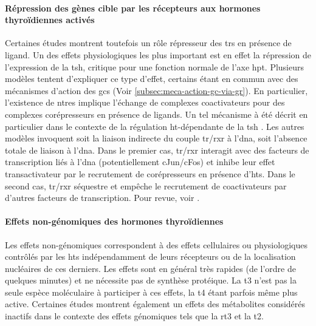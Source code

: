 

\paragraph{Répression des gènes cible par les récepteurs aux hormones thyroïdiennes activés}
Certaines études montrent toutefois un rôle répresseur des \glspl{tr} en présence de ligand.
Un des effets physiologiques les plus important est en effet la répression de l'expression de la \gls{tsh}, critique pour une fonction normale de l'axe \gls{hpt}.
Plusieurs modèles tentent d'expliquer ce type d'effet, certains étant en commun avec des mécanismes d'action des \glspl{gc} (Voir \autoref{subsec:meca-action-gc-via-gr}).
En particulier, l'existence de \glspl{ntre} implique l'échange de complexes coactivateurs pour des complexes corépresseurs en présence de ligands.
Un tel mécanisme à été décrit en particulier dans le contexte de la régulation \gls{ht}-dépendante de la \gls{tsh} \citep{Sasaki1999}.
Les autres modèles invoquent soit la liaison indirecte du couple \gls{tr}/\gls{rxr} à l'\gls{dna}, soit l'absence totale de liaison à l'\gls{dna}.
Dans le premier cas, \gls{tr}/\gls{rxr} interagit avec des facteurs de transcription liés à l'\gls{dna} (potentiellement cJun/cFos) et inhibe leur effet transactivateur par le recrutement de corépresseurs en présence d'\glspl{ht}.
Dans le second cas, \gls{tr}/\gls{rxr} séquestre et empêche le recrutement de coactivateurs par d'autres facteurs de transcription.
Pour revue, voir \citet{Lazar2003,Weitzel2008}.

\paragraph{Effets non-génomiques des hormones thyroïdiennes}
Les effets non-génomiques correspondent à des effets cellulaires ou physiologiques contrôlés par les \glspl{ht} indépendamment de leurs récepteurs ou de la localisation nucléaires de ces derniers.
Les effets sont en général très rapides (de l'ordre de quelques minutes) et ne nécessite pas de synthèse protéique.
La \gls{t3} n'est pas la seule espèce moléculaire à participer à ces effets, la \gls{t4} étant parfois même plus active.
Certaines études montrent également un effets des métabolites considérés inactifs dans le contexte des effets génomiques tels que la \gls{rt3} et la \gls{t2}.


